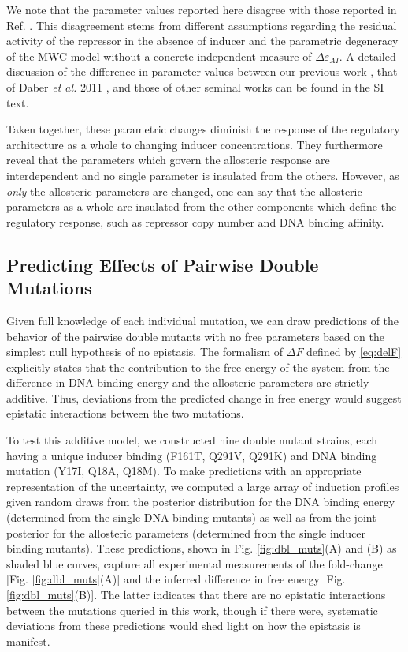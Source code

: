 We note that the parameter values reported here
disagree with those reported in Ref. \cite{Daber2011a}. This disagreement stems
from different assumptions regarding the residual activity of the repressor in
the absence of inducer and the parametric degeneracy of the MWC model without a
concrete independent measure of $\Delta\varepsilon_{AI}$. A detailed discussion
of the difference in parameter values between our previous work
\cite{Razo-Mejia2018}, that of Daber \textit{et al.} 2011 \cite{Daber2011a}, and
those of other seminal works \cite{OGorman1980, Daber2009} can be found in the
SI text.

Taken together, these parametric changes diminish the response of the regulatory
architecture as a whole to changing inducer concentrations. They furthermore
reveal that the parameters which govern the allosteric response are 
interdependent and no single parameter is insulated from the others. However, as
\textit{only} the allosteric parameters are changed, one can
say that the allosteric parameters as a whole are insulated from the other
components which define the regulatory response, such as repressor copy number
and DNA binding affinity. 

\subsection{Predicting Effects of Pairwise Double Mutations}
Given full knowledge of each individual mutation, we can draw predictions of the
behavior of the pairwise double mutants with no free parameters based on the
simplest null hypothesis of no epistasis. The formalism of $\Delta F$ defined by
\eqref{eq:delF} explicitly states that the contribution to the free energy
of the system from the difference in DNA binding energy and the allosteric parameters are
strictly additive. Thus, deviations from the predicted change in free energy
would suggest epistatic interactions between the two mutations.

To test this additive model, we constructed nine double mutant strains, each
having a unique inducer binding (F161T, Q291V, Q291K) and DNA binding
mutation (Y17I, Q18A, Q18M). To make predictions with an appropriate
representation of the uncertainty, we computed a large array of induction
profiles given random draws from the posterior distribution for the DNA binding
energy (determined from the single DNA binding mutants) as well as from the
joint posterior for the allosteric parameters (determined from the single
inducer binding mutants). These predictions, shown in Fig.
\ref{fig:dbl_muts}(A) and (B) as shaded blue curves, capture all
experimental measurements of the fold-change [Fig. \ref{fig:dbl_muts}(A)] and
the inferred difference in free energy [Fig. \ref{fig:dbl_muts}(B)]. The
latter indicates that there are no epistatic interactions between the
mutations queried in this work, though if there were, systematic deviations from these
predictions would shed light on how the epistasis is manifest. 

